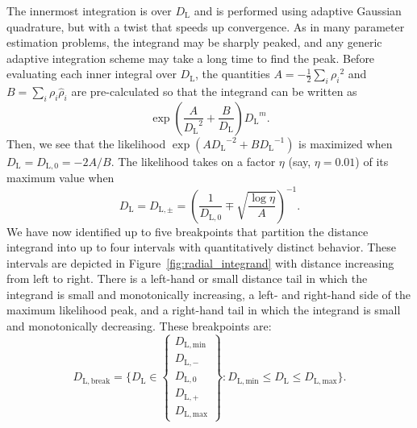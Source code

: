 \documentclass{iopart}
\begin{document}
The innermost integration is over $D_\mathrm{L}$ and is performed using adaptive Gaussian quadrature, but with a twist that speeds up convergence. As in many parameter estimation problems, the integrand may be sharply peaked, and any generic adaptive integration scheme may take a long time to find the peak. Before evaluating each inner integral over $D_\mathrm{L}$, the quantities $A=-\frac{1}{2} \sum_i {\rho_i}^2$ and $B=\sum_i \rho_i \hat\rho_i$ are pre\nobreakdashes-calculated so that the integrand can be written as
%
\begin{equation*}
    \exp\left(\frac{A}{{D_\mathrm{L}}^2} + \frac{B}{D_\mathrm{L}}\right) {D_\mathrm{L}}^m.
\end{equation*}
%
Then, we see that the likelihood $\exp(A {D_\mathrm{L}}^{-2} + B {D_\mathrm{L}}^{-1})$ is maximized when $D_\mathrm{L} = D_{\mathrm{L},0} = -2A/B$. The likelihood takes on a factor $\eta$ (say, $\eta=0.01$) of its maximum value when
%
\begin{equation}
    D_\mathrm{L} = D_{\mathrm{L},\pm} = \left(\frac{1}{D_{\mathrm{L},0}} \mp \sqrt{\frac{\log\eta}{A}}\right)^{-1}.
\end{equation}
%
We have now identified up to five breakpoints that partition the distance integrand into up to four intervals with quantitatively distinct behavior. These intervals are depicted in Figure~\ref{fig:radial_integrand} with distance increasing from left to right. There is a left\nobreakdashes-hand or small distance tail in which the integrand is small and monotonically increasing, a left\nobreakdashes- and right\nobreakdashes-hand side of the maximum likelihood peak, and a right\nobreakdashes-hand tail in which the integrand is small and monotonically decreasing. These breakpoints are:
%
\begin{equation}
    D_{\mathrm{L},\mathrm{break}} = \{ D_\mathrm{L} \in
    \left\{
    \begin{array}{c}
    D_{\mathrm{L},\mathrm{min}} \\
    D_{\mathrm{L},-} \\
    D_{\mathrm{L},0} \\
    D_{\mathrm{L},+} \\
    D_{\mathrm{L},\mathrm{max}}
    \end{array}
    \right\} :
    D_{\mathrm{L},\mathrm{min}} \leq D_\mathrm{L}
    \leq D_{\mathrm{L},\mathrm{max}}\}.
\end{equation}
%
\end{document}
